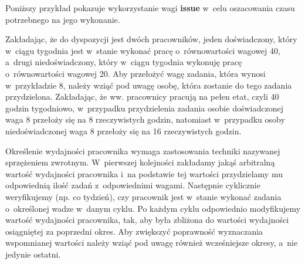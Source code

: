 Poniższy przykład pokazuje wykorzystanie wagi \textbf{issue} w~celu oszacowania czasu potrzebnego na jego wykonanie.\par
Zakładając, że do dyspozycji jest dwóch pracowników, jeden doświadczony, który w~ciągu tygodnia jest w~stanie wykonać pracę o~równowartości wagowej 40, a~drugi niedoświadczony, który w~ciągu tygodnia wykonuję pracę o~równowartości wagowej 20. Aby przełożyć wagę zadania, która wynosi w~przykładzie 8, należy wziąć pod uwagę osobę, która zostanie do tego zadania przydzielona. Zakładając, że ww. pracownicy pracują na pełen etat, czyli 40 godzin tygodniowo, w~przypadku przydzielenia zadania osobie doświadczonej waga 8 przełoży się na 8 rzeczywistych godzin, natomiast w~przypadku osoby niedoświadczonej waga 8 przełoży się na 16 rzeczywistych godzin. \par

Określenie wydajności pracownika wymaga zastosowania techniki nazywanej sprzężeniem zwrotnym. W~pierwszej kolejności zakładamy jakąś arbitralną wartość wydajności pracownika i~na podstawie tej wartości przydzielamy mu odpowiednią ilość zadań z~odpowiednimi wagami. Następnie cyklicznie weryfikujemy (np. co tydzień), czy pracownik jest w~stanie wykonać zadania o~określonej wadze w~danym cyklu. Po każdym cyklu odpowiednio modyfikujemy wartość wydajności pracownika, tak, aby była zbliżona do wartości wydajności osiągniętej za poprzedni okres. Aby zwiększyć poprawność wyznaczania wspomnianej wartości należy wziąć pod uwagę również wcześniejsze okresy, a~nie jedynie ostatni.\par

\newpage

